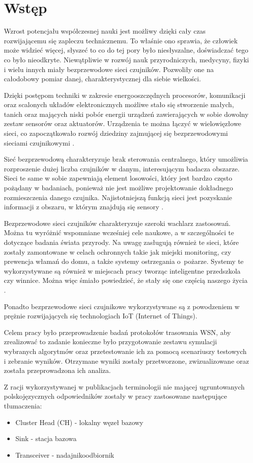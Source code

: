 \chapter{Wstęp}
Wzrost potencjału współczesnej nauki jest możliwy dzięki cały czas rozwijającemu się zapleczu technicznemu. To właśnie ono sprawia, że człowiek może widzieć więcej, słyszeć to co do tej pory było niesłyszalne, doświadczać tego co było nieodkryte. Niewątpliwie w rozwój nauk przyrodniczych, medycyny, fizyki i wielu innych miały bezprzewodowe sieci czujników. Pozwoliły one na całodobowy pomiar danej, charakterystycznej dla siebie wielkości.

Dzięki postępom techniki w zakresie energooszczędnych procesorów, komunikacji oraz scalonych układów elektronicznych możliwe stało się stworzenie małych, tanich oraz mających niski pobór energii urządzeń zawierających w sobie dowolny zestaw sensorów oraz aktuatorów. Urządzenia te można łączyć w wielowięzłowe sieci, co zapoczątkowało rozwój dziedziny zajmującej się bezprzewodowymi sieciami czujnikowymi \cite{FahmyIntro2016}. 

Sieć bezprzewodową charakteryzuje brak sterowania centralnego, który umożliwia rozproszenie dużej liczba czujników w danym, interesującym badacza obszarze. Sieci te same w sobie zapewniają element losowości, który jest bardzo często pożądany w badaniach, ponieważ nie jest możliwe projektowanie dokładnego rozmieszczenia danego czujnika. Najistotniejszą funkcją sieci jest pozyskanie informacji z obszaru, w którym znajdują się sensory \cite{Akyildiz2010}.

Bezprzewodowe sieci czujników charakteryzuje szeroki wachlarz zastosowań. Można tu wyróżnić wspomniane wcześniej cele naukowe, a w szczególności te dotyczące badania świata przyrody. Na uwagę zasługują również te sieci, które zostały zamontowane w celach ochronnych takie jak miejski monitoring, czy prewencja włamań do domu, a także systemy ostrzegania o~pożarze. Systemy te wykorzystywane są również w miejscach pracy tworząc inteligentne przedszkola czy winnice. Można więc śmiało powiedzieć, że
stały się one częścią naszego życia \cite{Ilyas2004}.

Ponadto bezprzewodowe sieci czujnikowe wykorzystywane są z powodzeniem w prężnie rozwijających się technologiach IoT (Internet of Things). 

Celem pracy było przeprowadzenie badań protokołów trasowania WSN, aby zrealizować to zadanie konieczne było przygotowanie zestawu symulacji wybranych algorytmów oraz przetestowanie ich za pomocą scenariuszy testowych i zebranie wyników. Otrzymane wyniki zostały przetworzone, zwizualizowane oraz została przeprowadzona ich analiza.

Z racji wykorzystywanej w publikacjach terminologii nie mającej ugruntowanych polskojęzycznych odpowiedników zostały w pracy zastosowane następujące tłumaczenia:
\begin{itemize}
\item Cluster Head (CH) - lokalny węzeł bazowy
\item Sink - stacja bazowa
\item Transceiver - nadajnikoodbiornik
\end{itemize}